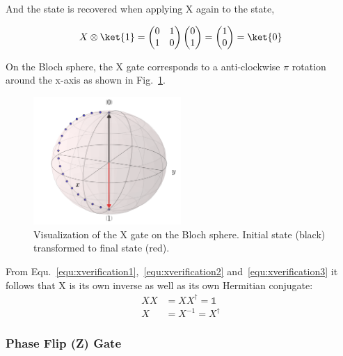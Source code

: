 And the \0 state is recovered when applying X again to the \1 state,

\begin{equation}
\label{equ:xverification3}
X \otimes \ket{1} = \begin{pmatrix}
 0 & 1 \\ 
 1 & 0
 \end{pmatrix} \begin{pmatrix}
 0  \\ 
 1
 \end{pmatrix} = \begin{pmatrix}
 1  \\ 
 0 \end{pmatrix} =  \ket{0}
\end{equation}

On the Bloch sphere, the X gate corresponds to a anti-clockwise $\pi$ rotation around the x-axis as shown in Fig.~\ref{img:blochxgate}.

\begin{figure}[ht]
   \centering
   \includegraphics[width=0.5\textwidth]{img/blochxgate.png}
   \caption{Visualization of the X gate on the Bloch sphere. Initial state (black) transformed to final state (red).}
   \label{img:blochxgate}
\end{figure}

From Equ.~\ref{equ:xverification1},~\ref{equ:xverification2} and~\ref{equ:xverification3} it follows that X is its own inverse as well as its own Hermitian conjugate:
\begin{align}
XX &= XX^\dagger = \mathbb{1} \\
X &= X^{-1} = X^\dagger
\end{align}

\subsubsection{Phase Flip (Z) Gate}
\label{subsubsubsec:zgate}

